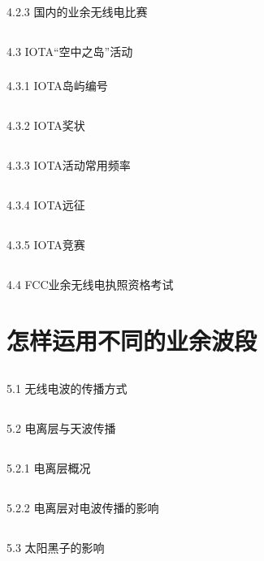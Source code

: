 \documentclass[12pt,UTF8]{ctexbook}
\begin{document}
\subsection{}4.2.3 国内的业余无线电比赛
\section{}4.3 IOTA“空中之岛”活动
\subsection{}4.3.1 IOTA岛屿编号
\section{}4.3.2 IOTA奖状
\section{}4.3.3 IOTA活动常用频率
\section{}4.3.4 IOTA远征
\section{}4.3.5 IOTA竞赛
\section{}4.4 FCC业余无线电执照资格考试

\chapter{怎样运用不同的业余波段}

\section{}5.1 无线电波的传播方式
\section{}5.2 电离层与天波传播
\section{}5.2.1 电离层概况
\section{}5.2.2 电离层对电波传播的影响
\section{}5.3 太阳黑子的影响
\end{document}
